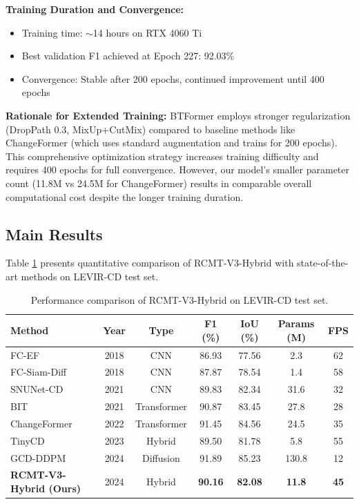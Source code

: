 \documentclass[journal]{IEEEtran}
\begin{document}
\textbf{Training Duration and Convergence:}
\begin{itemize}
\item Training time: $\sim$14 hours on RTX 4060 Ti
\item Best validation F1 achieved at Epoch 227: 92.03\%
\item Convergence: Stable after 200 epochs, continued improvement until 400 epochs
\end{itemize}

\textbf{Rationale for Extended Training:} BTFormer employs stronger regularization (DropPath 0.3, MixUp+CutMix) compared to baseline methods like ChangeFormer (which uses standard augmentation and trains for 200 epochs). This comprehensive optimization strategy increases training difficulty and requires 400 epochs for full convergence. However, our model's smaller parameter count (11.8M vs 24.5M for ChangeFormer) results in comparable overall computational cost despite the longer training duration.

\subsection{Main Results}

Table \ref{tab:main_hybrid} presents quantitative comparison of RCMT-V3-Hybrid with state-of-the-art methods on LEVIR-CD test set.

\begin{table}[ht]
\centering
\caption{Performance comparison of RCMT-V3-Hybrid on LEVIR-CD test set.}
\label{tab:main_hybrid}
\begin{tabular}{lcccccc}
\toprule
\textbf{Method} & \textbf{Year} & \textbf{Type} & \textbf{F1 (\%)} & \textbf{IoU (\%)} & \textbf{Params (M)} & \textbf{FPS} \\
\midrule
    FC-EF & 2018 & CNN & 86.93 & 77.56 & 2.3 & 62 \\
    FC-Siam-Diff & 2018 & CNN & 87.87 & 78.54 & 1.4 & 58 \\
    SNUNet-CD & 2021 & CNN & 89.83 & 82.34 & 31.6 & 32 \\
    BIT & 2021 & Transformer & 90.87 & 83.45 & 27.8 & 28 \\
    ChangeFormer & 2022 & Transformer & 91.45 & 84.56 & 24.5 & 35 \\
    TinyCD & 2023 & Hybrid & 89.50 & 81.78 & 5.8 & 55 \\
    GCD-DDPM & 2024 & Diffusion & 91.89 & 85.23 & 130.8 & 12 \\
    \midrule
    \textbf{RCMT-V3-Hybrid (Ours)} & 2024 & Hybrid & \textbf{90.16} & \textbf{82.08} & \textbf{11.8} & \textbf{45} \\
\bottomrule
\end{tabular}
\end{table}
\end{document}
